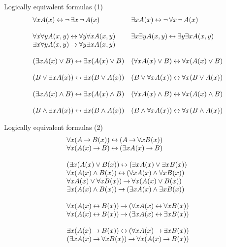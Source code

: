 \documentclass[style=simple,size=12pt]{powerdot}
\begin{document}
\begin{wideslide}[bm=,toc=]{Logically equivalent formulas (1)}
\vspace*{-8mm}
\begin{displaymath}
\begin{array}{ll}
 \forall xA(x)\mathbin{\leftrightarrow} \mathop{\neg} \exists x\mathop{\neg} A(x) &
 \exists xA(x)\mathbin{\leftrightarrow} \mathop{\neg} \forall x\mathop{\neg} A(x) \\
\\
 \forall x\forall yA(x,y) \mathbin{\leftrightarrow} \forall y\forall xA(x,y) &
 \exists x\exists yA(x,y) \mathbin{\leftrightarrow} \exists y\exists xA(x,y) \\
 \exists x\forall yA(x,y)\mathbin{\rightarrow} \forall y\exists xA(x,y) \\
\\
 (\exists xA(x) \vee B) \mathbin{\leftrightarrow} \exists x(A(x) \vee  B) &
 (\forall xA(x) \vee B) \mathbin{\leftrightarrow} \forall x(A(x) \vee  B) \\
\\
 (B \vee \exists xA(x)) \mathbin{\leftrightarrow} \exists x(B \vee A(x)) &
 (B \vee \forall xA(x)) \mathbin{\leftrightarrow} \forall x(B \vee A(x)) \\
\\
 (\exists xA(x) \wedge B) \mathbin{\leftrightarrow} \exists x(A(x) \wedge B) &
 (\forall xA(x) \wedge B) \mathbin{\leftrightarrow} \forall x(A(x) \wedge B) \\
\\
 (B \wedge \exists xA(x)) \mathbin{\leftrightarrow} \exists x(B \wedge A(x)) &
 (B \wedge \forall xA(x)) \mathbin{\leftrightarrow} \forall x(B \wedge A(x)) \\
\end{array}
\end{displaymath}
\end{wideslide}

\begin{wideslide}[bm=,toc=]{Logically equivalent formulas (2)}
\vspace*{-10mm}
\begin{displaymath}
\begin{array}{l}
 \forall x(A\mathbin{\rightarrow} B(x)) \mathbin{\leftrightarrow} (A \mathbin{\rightarrow} \forall xB(x)) \\
 \forall x(A(x)\mathbin{\rightarrow} B) \mathbin{\leftrightarrow} (\exists xA(x) \mathbin{\rightarrow} B) \\
\\
 (\exists x(A(x)\vee B(x))
\mathbin{\leftrightarrow} (\exists xA(x) \vee \exists xB(x)) \\
 \forall x(A(x)\wedge B(x))
\mathbin{\leftrightarrow} (\forall xA(x) \wedge \forall xB(x)) \\
\forall xA(x)\vee\forall xB(x))
\mathbin{\rightarrow} \forall x(A(x)\vee B(x)) \\
 \exists x(A(x)\wedge B(x))\mathbin{\rightarrow}
(\exists xA(x) \wedge \exists xB(x)) \\
\\
 \forall x(A(x)\mathbin{\leftrightarrow} B(x))\mathbin{\rightarrow}
(\forall xA(x) \mathbin{\leftrightarrow} \forall xB(x)) \\
 \forall x(A(x)\mathbin{\leftrightarrow} B(x))\mathbin{\rightarrow}
(\exists xA(x) \mathbin{\leftrightarrow} \exists xB(x)) \\
\\
 \exists x(A(x)\mathbin{\rightarrow} B(x))\mathbin{\leftrightarrow}
  (\forall xA(x)\mathbin{\rightarrow}\exists xB(x))  \\
 (\exists xA(x)\mathbin{\rightarrow}\forall xB(x))\mathbin{\rightarrow}
  \forall x(A(x)\mathbin{\rightarrow} B(x))  \\
\end{array}
\end{displaymath}
\end{wideslide}
\end{document}

